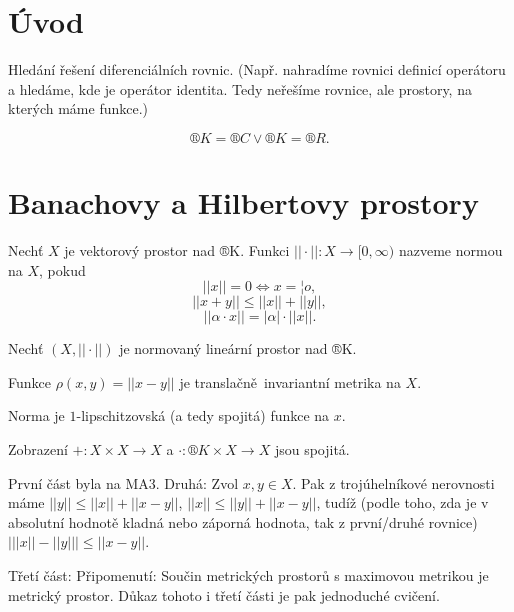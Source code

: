 \documentclass[12pt]{article}					%
\begin{document}


\section*{Úvod}

\begin{poznamka}[Motivace]
	Hledání řešení diferenciálních rovnic. (Např. nahradíme rovnici definicí operátoru a hledáme, kde je operátor identita. Tedy neřešíme rovnice, ale prostory, na kterých máme funkce.)
\end{poznamka}

\begin{definice}
	$$ ®K = ®C \lor ®K = ®R. $$ 
\end{definice}

\section{Banachovy a Hilbertovy prostory}

\begin{definice}
	Nechť $X$ je vektorový prostor nad ®K. Funkci $||·||: X \rightarrow [0, ∞)$ nazveme normou na $X$, pokud
	$$ || x || = 0 \Leftrightarrow x = ¦o, $$
	$$ || x + y || ≤ || x || + || y ||, $$ 
	$$ || \alpha·x || = | \alpha | · || x ||. $$ 
\end{definice}

\begin{tvrzeni}
	Nechť $\left( X, || · || \right) $ je normovaný lineární prostor nad ®K.
	
	Funkce $\rho\left( x, y  \right) = || x - y ||$ je translačně invariantní metrika na $X$.

	Norma  je $1$-lipschitzovská (a tedy spojitá) funkce na $x$.

	Zobrazení $+: X \times X \rightarrow X$ a $·: ®K \times X \rightarrow X$ jsou spojitá.

	\begin{dukazin}
		První část byla na MA3. Druhá: Zvol $x, y \in X$. Pak z trojúhelníkové nerovnosti máme $||y|| ≤ ||x|| + ||x - y||$, $||x|| ≤ ||y|| + ||x - y||$, tudíž (podle toho, zda je v absolutní hodnotě kladná nebo záporná hodnota, tak z první/druhé rovnice) $\big|||x|| - ||y|| \big| ≤ ||x - y||$.

		Třetí část: Připomenutí: Součin metrických prostorů s maximovou metrikou je metrický prostor. Důkaz tohoto i třetí části je pak jednoduché cvičení.
	\end{dukazin}
\end{tvrzeni}
\end{document}
